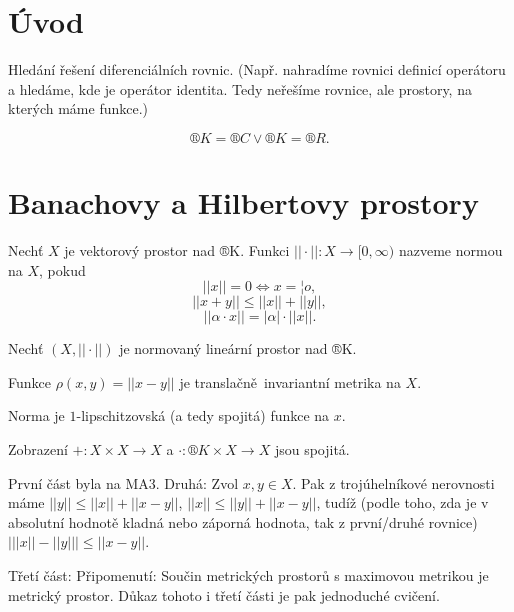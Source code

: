 \documentclass[12pt]{article}					%
\begin{document}


\section*{Úvod}

\begin{poznamka}[Motivace]
	Hledání řešení diferenciálních rovnic. (Např. nahradíme rovnici definicí operátoru a hledáme, kde je operátor identita. Tedy neřešíme rovnice, ale prostory, na kterých máme funkce.)
\end{poznamka}

\begin{definice}
	$$ ®K = ®C \lor ®K = ®R. $$ 
\end{definice}

\section{Banachovy a Hilbertovy prostory}

\begin{definice}
	Nechť $X$ je vektorový prostor nad ®K. Funkci $||·||: X \rightarrow [0, ∞)$ nazveme normou na $X$, pokud
	$$ || x || = 0 \Leftrightarrow x = ¦o, $$
	$$ || x + y || ≤ || x || + || y ||, $$ 
	$$ || \alpha·x || = | \alpha | · || x ||. $$ 
\end{definice}

\begin{tvrzeni}
	Nechť $\left( X, || · || \right) $ je normovaný lineární prostor nad ®K.
	
	Funkce $\rho\left( x, y  \right) = || x - y ||$ je translačně invariantní metrika na $X$.

	Norma  je $1$-lipschitzovská (a tedy spojitá) funkce na $x$.

	Zobrazení $+: X \times X \rightarrow X$ a $·: ®K \times X \rightarrow X$ jsou spojitá.

	\begin{dukazin}
		První část byla na MA3. Druhá: Zvol $x, y \in X$. Pak z trojúhelníkové nerovnosti máme $||y|| ≤ ||x|| + ||x - y||$, $||x|| ≤ ||y|| + ||x - y||$, tudíž (podle toho, zda je v absolutní hodnotě kladná nebo záporná hodnota, tak z první/druhé rovnice) $\big|||x|| - ||y|| \big| ≤ ||x - y||$.

		Třetí část: Připomenutí: Součin metrických prostorů s maximovou metrikou je metrický prostor. Důkaz tohoto i třetí části je pak jednoduché cvičení.
	\end{dukazin}
\end{tvrzeni}
\end{document}
